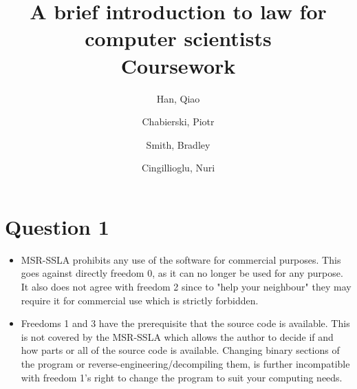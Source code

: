 \documentclass[10pt,a4paper]{article}
\begin{document}
\title{A brief introduction to law for computer
scientists \\
Coursework}
\author{
  Han, Qiao\\
  \and
  Chabierski, Piotr\\
  \and
  Smith, Bradley\\
  \and
  Cingillioglu, Nuri\\
}

\maketitle

\section*{Question 1}
\begin{itemize}
\item MSR-SSLA prohibits any use of the software for commercial purposes. This goes against  directly freedom 0, as it can no longer be used for any purpose. It also does not agree with freedom 2 since to "help your neighbour" they may require it for commercial use which is strictly forbidden.   
\item Freedoms 1 and 3 have the prerequisite that the source code is available. This is not covered by the MSR-SSLA which allows the author to decide if and how parts or all of the source code is available. Changing binary sections of the program or reverse-engineering/decompiling them, is further incompatible with freedom 1's right to change the program to suit your computing needs.    
\end{itemize}
\end{document}
